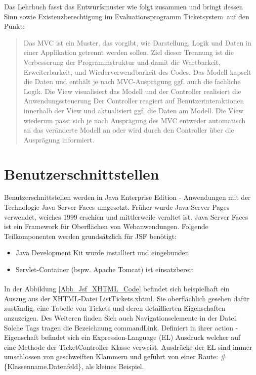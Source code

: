Das Lehrbuch fasst das Entwurfsmuster wie folgt zusammen und bringt dessen Sinn sowie Existenzberechtigung im Evaluationsprogramm \glqq Ticketsystem\grqq\ auf den Punkt:

\blockcquote{javaeeworkshop}{
	Das MVC ist ein Muster, das vorgibt, wie Darstellung, Logik und Daten in einer Applikation getrennt werden sollen. Ziel dieser Trennung ist die Verbesserung der Programmstruktur und damit die Wartbarkeit, Erweiterbarkeit, und Wiederverwendbarkeit des Codes.
	Das Modell kapselt die Daten und enthält je nach MVC-Ausprägung ggf. auch die fachliche Logik. Die View visualisiert das Modell und der Controller realisiert die Anwendungssteuerung Der Controller reagiert auf Benutzerinteraktionen innerhalb der View und aktualisiert ggf. die Daten am Modell. Die View wiederum passt sich je nach Ausprägung des MVC entweder automatisch an das veränderte Modell an oder wird durch den Controller über die Ausprägung informiert.
}

\section{Benutzerschnittstellen} 
Benutzerschnittstellen werden in Java Enterprise Edition - Anwendungen mit der Technologie \glqq Java Server Faces \grqq umgesetzt. Früher wurde \glqq Java Server Pages \grqq verwendet, weiches 1999 erschien und mittlerweile veraltet ist. Java Server Faces ist ein Framework für Oberflächen von Webanwendungen. Folgende Teilkomponenten werden grundsätzlich für JSF benötigt:

\begin{itemize}
	\item Java Development Kit wurde installiert und eingebunden
	\item Servlet-Container (bspw. Apache Tomcat) ist einsatzbereit
\end{itemize}
\paragraph{}
In der Abbildung \ref{Abb_Jsf_XHTML_Code} befindet sich beispielhaft ein Auszug aus der XHTML-Datei ListTickets.xhtml. Sie oberflächlich gesehen dafür zuständig, eine Tabelle von Tickets und deren detaillierten Eigenschaften anzuzeigen. Des Weiteren finden Sich auch Navigationselemente in der Datei. Solche Tags tragen die Bezeichnung \glqq commandLink\grqq. Definiert in ihrer \glqq action \grqq -Eigenschaft befindet sich ein Expression-Language (EL) Ausdruck welcher auf eine Methode der TicketController Klasse verweist. Ausdrücke der EL sind immer umschlossen von geschweiften Klammern und geführt von einer Raute: \#\{Klassenname.Datenfeld\}, als kleines Beispiel.
